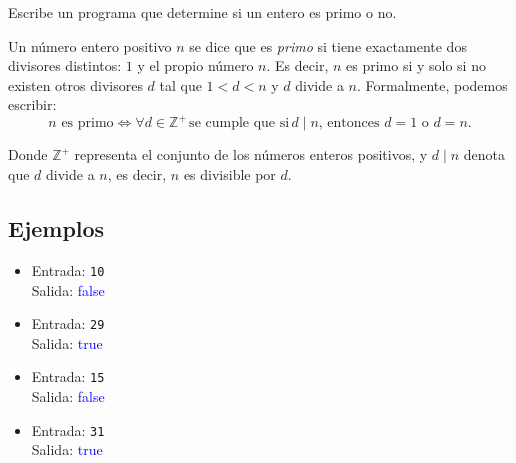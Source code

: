 Escribe un programa que determine si un entero es primo o no.
    
Un número entero positivo \( n \) se dice que es \textit{primo} si tiene exactamente dos divisores distintos: \( 1 \) y el propio número \( n \). Es decir, \( n \) es primo si y solo si no existen otros divisores \( d \) tal que \( 1 < d < n \) y \( d \) divide a \( n \). Formalmente, podemos escribir:
\[
n \text{ es primo} \iff  \forall d \in \mathbb{Z}^+ \, \text{se cumple que si} \, d \mid n \text{, entonces } d = 1 \text{ o } d = n.
\]

Donde \( \mathbb{Z}^+ \) representa el conjunto de los números enteros positivos, y \( d \mid n \) denota que \( d \) divide a \( n \), es decir, \( n \) es divisible por \( d \).
\subsection*{Ejemplos}
\begin{itemize}
    \item Entrada: \texttt{10}\\
          Salida: \textcolor{blue}{false}
    \item Entrada: \texttt{29}\\
          Salida: \textcolor{blue}{true}
    \item Entrada: \texttt{15}\\
          Salida: \textcolor{blue}{false}
    \item Entrada: \texttt{31}\\
          Salida: \textcolor{blue}{true}
\end{itemize}